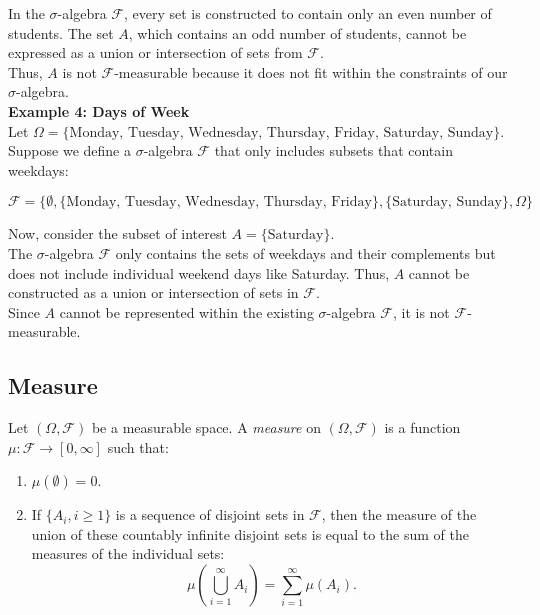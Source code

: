 In the \( \sigma \)-algebra \( \mathcal{F} \), every set is constructed to contain only an even number of students. The set \( A \), which contains an odd number of students, cannot be expressed as a union or intersection of sets from \( \mathcal{F} \).\\

Thus, \( A \) is not \( \mathcal{F} \)-measurable because it does not fit within the constraints of our \( \sigma \)-algebra.\\

\textbf{Example 4: Days of Week}\\

Let \( \Omega = \{\text{Monday, Tuesday, Wednesday, Thursday, Friday, Saturday, Sunday}\} \). Suppose we define a \( \sigma \)-algebra \( \mathcal{F} \) that only includes subsets that contain weekdays:

\[
\mathcal{F} = \{\emptyset, \{\text{Monday, Tuesday, Wednesday, Thursday, Friday}\}, \{\text{Saturday, Sunday}\}, \Omega\}
\]

Now, consider the subset of interest \( A = \{\text{Saturday}\} \).\\

The \( \sigma \)-algebra \( \mathcal{F} \) only contains the sets of weekdays and their complements but does not include individual weekend days like Saturday. Thus, \( A \) cannot be constructed as a union or intersection of sets in \( \mathcal{F} \).\\

Since \( A \) cannot be represented within the existing \( \sigma \)-algebra \( \mathcal{F} \), it is not \( \mathcal{F} \)-measurable.

\subsection{Measure}

\begin{definition}
    Let \((\Omega, \mathcal{F})\) be a measurable space. A \textit{measure} on \((\Omega, \mathcal{F})\) is a function \(\mu: \mathcal{F} \to [0, \infty]\) such that:

\begin{enumerate}
    \item \(\mu(\emptyset) = 0.\)
    \item If \(\{A_i, i \geq 1\}\) is a sequence of disjoint sets in \(\mathcal{F}\), then the measure of the union of these countably infinite disjoint sets is equal to the sum of the measures of the individual sets:
    \[
    \mu\left(\bigcup_{i=1}^{\infty} A_i\right) = \sum_{i=1}^{\infty} \mu(A_i).
    \]
\end{enumerate}
\end{definition}

